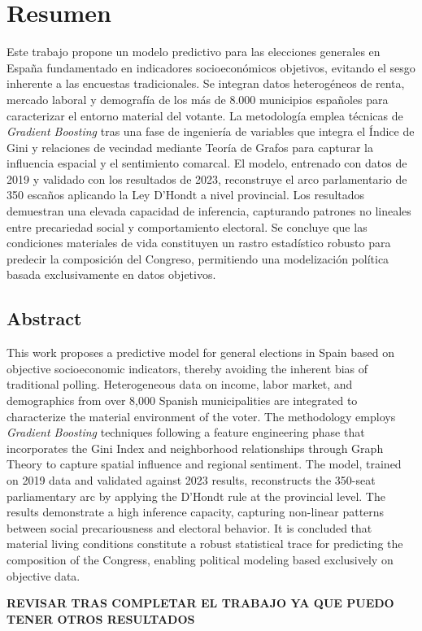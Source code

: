 \chapter*{Resumen}

Este trabajo propone un modelo predictivo para las elecciones generales en España fundamentado en indicadores socioeconómicos objetivos, evitando el sesgo inherente a las encuestas tradicionales. Se integran datos heterogéneos de renta, mercado laboral y demografía de los más de 8.000 municipios españoles para caracterizar el entorno material del votante. La metodología emplea técnicas de \textit{Gradient Boosting} tras una fase de ingeniería de variables que integra el Índice de Gini y relaciones de vecindad mediante Teoría de Grafos para capturar la influencia espacial y el sentimiento comarcal. El modelo, entrenado con datos de 2019 y validado con los resultados de 2023, reconstruye el arco parlamentario de 350 escaños aplicando la Ley D'Hondt a nivel provincial. Los resultados demuestran una elevada capacidad de inferencia, capturando patrones no lineales entre precariedad social y comportamiento electoral. Se concluye que las condiciones materiales de vida constituyen un rastro estadístico robusto para predecir la composición del Congreso, permitiendo una modelización política basada exclusivamente en datos objetivos.

\vspace{1cm}
\section*{Abstract}

This work proposes a predictive model for general elections in Spain based on objective socioeconomic indicators, thereby avoiding the inherent bias of traditional polling. Heterogeneous data on income, labor market, and demographics from over 8,000 Spanish municipalities are integrated to characterize the material environment of the voter. The methodology employs \textit{Gradient Boosting} techniques following a feature engineering phase that incorporates the Gini Index and neighborhood relationships through Graph Theory to capture spatial influence and regional sentiment. The model, trained on 2019 data and validated against 2023 results, reconstructs the 350-seat parliamentary arc by applying the D'Hondt rule at the provincial level. The results demonstrate a high inference capacity, capturing non-linear patterns between social precariousness and electoral behavior. It is concluded that material living conditions constitute a robust statistical trace for predicting the composition of the Congress, enabling political modeling based exclusively on objective data.

\vspace{2cm}
\begin{center}
    \textbf{\Large REVISAR TRAS COMPLETAR EL TRABAJO YA QUE PUEDO TENER OTROS RESULTADOS}
\end{center}
